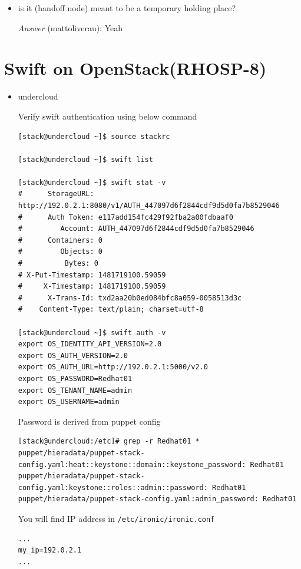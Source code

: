 \documentclass{article}
\begin{document}
\begin{itemize}
\item is it (handoff node) meant to be a temporary holding place?

\emph{Answer} (mattoliverau): Yeah
\end{itemize}

\section{Swift on OpenStack(RHOSP-8)}
\label{sec:org138bb92}

\begin{itemize}
\item undercloud

Verify swift authentication using below command

\begin{verbatim}
[stack@undercloud ~]$ source stackrc

[stack@undercloud ~]$ swift list

[stack@undercloud ~]$ swift stat -v
#      StorageURL: http://192.0.2.1:8080/v1/AUTH_447097d6f2844cdf9d5d0fa7b8529046
#      Auth Token: e117add154fc429f92fba2a00fdbaaf0
#         Account: AUTH_447097d6f2844cdf9d5d0fa7b8529046
#      Containers: 0
#         Objects: 0
#      	   Bytes: 0
# X-Put-Timestamp: 1481719100.59059
#     X-Timestamp: 1481719100.59059
#      X-Trans-Id: txd2aa20b0ed084bfc8a059-0058513d3c
#    Content-Type: text/plain; charset=utf-8

[stack@undercloud ~]$ swift auth -v
export OS_IDENTITY_API_VERSION=2.0
export OS_AUTH_VERSION=2.0
export OS_AUTH_URL=http://192.0.2.1:5000/v2.0
export OS_PASSWORD=Redhat01
export OS_TENANT_NAME=admin
export OS_USERNAME=admin
\end{verbatim}

Password is derived from puppet config

\begin{verbatim}
[stack@undercloud:/etc]# grep -r Redhat01 *
puppet/hieradata/puppet-stack-config.yaml:heat::keystone::domain::keystone_password: Redhat01
puppet/hieradata/puppet-stack-config.yaml:keystone::roles::admin::password: Redhat01
puppet/hieradata/puppet-stack-config.yaml:admin_password: Redhat01
\end{verbatim}

You will find IP address in \texttt{/etc/ironic/ironic.conf}

\begin{verbatim}
...
my_ip=192.0.2.1
...
\end{verbatim}


\end{itemize}
\end{document}
